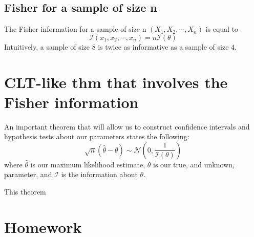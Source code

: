 \subsection{Fisher for a sample of size n}

The Fisher information for a sample of size n $(X_{1},X_{2},\cdots, X_{n})$ is equal to 
\begin{equation}
    \mathcal{I}(x_{1},x_{2},\cdots,x_{n}) = n \mathcal{I}(\theta)
\end{equation}
Intuitively, a sample of size $8$ is twice as informative as a sample of size $4$.

\section{CLT-like thm that involves the Fisher information}

An important theorem that will allow us to construct confidence intervals and hypothesis tests about our parameters states the following: 
\begin{equation}
    \sqrt{n}(\hat{\theta} - \theta) \sim \mathcal{N}\left(0,\frac{1}{\mathcal{I}(\theta)}\right)   
\end{equation}
where $\hat{\theta}$ is our maximum likelihood estimate, $\theta$ is our true, and unknown, parameter, and $\mathcal{I}$ is the information about $\theta$.

This theorem 


\section{Homework}

